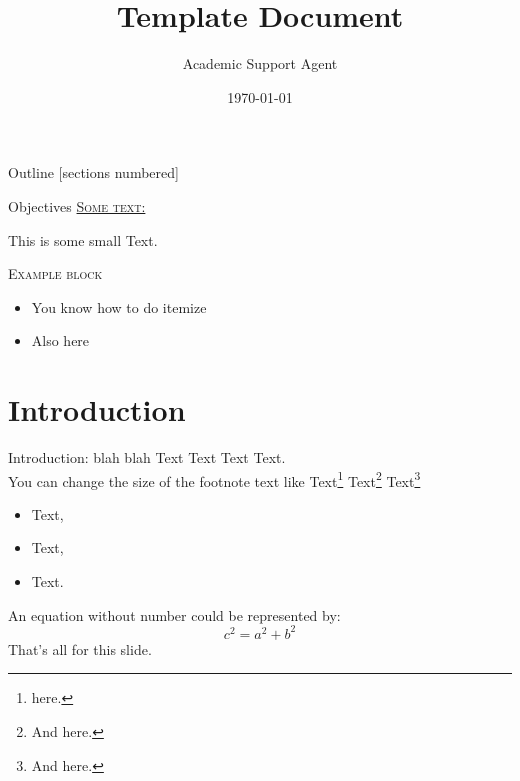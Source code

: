\documentclass{article}
\title{Template Document}
\author{Academic Support Agent}
\date{\today}
\begin{document}
\maketitle

{
\maketitle
}%


\begin{frame}{Outline}
  [sections numbered] %
  
\end{frame}

\begin{frame}{Objectives}
\underline{\textsc{Some text:}}
\begin{small}
This is some small Text. 
\end{small}

\begin{exampleblock}{\textsc{Example block}}
\begin{itemize}
    \item You know how to do itemize
    \item Also here
\end{itemize}
\end{exampleblock}
\end{frame}


\section{Introduction}

\begin{frame}[fragile]{Introduction: blah blah} %
Text Text Text Text. \\You can change the size of the footnote text like  Text\footnote{\small{ here.}} Text\footnote{\large{And here.}} Text\footnote{\tiny{And here.}}
\begin{itemize} %
    \item[$\diamond$] Text,
    \item[$\diamond$] Text,
    \item[$\diamond$] Text.
\end{itemize}
An equation without number could be represented by:
\begin{equation*}
    c^{2} = a^{2} + b^{2}
\end{equation*}
That's all for this slide.
\end{frame}
\end{document}
